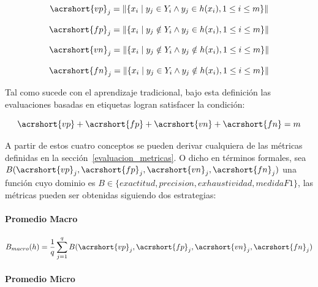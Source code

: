 \begin{equation}
	\acrshort{vp}_{j} = \left\|\{x_{i}\mid y_{j} \in Y_{i} \land y_{j} \in
	h(x_{i}), 1 \leq i \leq m\}\right\|
\end{equation}

\begin{equation}
	\acrshort{fp}_{j} = \left\|\{x_{i}\mid y_{j} \notin Y_{i} \land y_{j} \in
	h(x_{i}), 1 \leq i \leq m\}\right\|
\end{equation}

\begin{equation}
	\acrshort{vn}_{j} = \left\|\{x_{i}\mid y_{j} \notin Y_{i} \land y_{j} \notin
	h(x_{i}), 1 \leq i \leq m\}\right\|
\end{equation}

\begin{equation}
	\acrshort{fn}_{j} = \left\|\{x_{i}\mid y_{j} \in Y_{i} \land y_{j} \notin
	h(x_{i}), 1 \leq i \leq m\}\right\|
\end{equation}

Tal como sucede con el aprendizaje tradicional, bajo esta definición las
evaluaciones basadas en etiquetas logran satisfacer la condición:

\begin{equation}
	\acrshort{vp} + \acrshort{fp} + \acrshort{vn} + \acrshort{fn} = m
\end{equation}

A partir de estos cuatro conceptos se pueden derivar cualquiera de las métricas
definidas en la sección~\ref{evaluacion_metricas}. O dicho en términos formales,
sea $B(\acrshort{vp}_{j}, \acrshort{fp}_{j}, \acrshort{vn}_{j},
	\acrshort{fn}_{j})$ una función cuyo dominio es $B \in \{ exactitud, precision,
	exhaustividad, medidaF1 \}$, las métricas pueden ser obtenidas siguiendo dos
estrategias:

\paragraph{Promedio Macro}

\begin{equation}
	B_{macro}(h) = \frac{1}{q} \sum_{j=1}^{q}
	B(\acrshort{vp}_{j}, \acrshort{fp}_{j}, \acrshort{vn}_{j}, \acrshort{fn}_{j})
\end{equation}

\paragraph{Promedio Micro}

